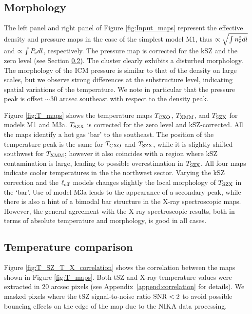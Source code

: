 \documentclass[twocolumn,traditabstract]{aa}
\newcommand{\ccor}[1]{\textcolor{Mypink}{#1}}
\def\xe {n_{\rm e}}
\def\pe {P_{\rm e}}
\def\TSZ {T_{\rm SZX}}
\def \TXC {T_{\rm CXO}}
\def \TXX {T_{\rm XMM}}
\begin{document}
\subsection{Morphology}
\ccor{The left panel and right panel of Figure \ref{fig:Input_maps} represent the effective density and pressure maps in the case of the simplest model M1, thus $\propto \sqrt{\int\xe^2 dl}$ and $\propto \int \pe dl$, respectively. The pressure map is corrected for the kSZ and the zero level (see Section \ref{sec:compT}). The cluster clearly exhibits a disturbed morphology. The morphology of the ICM pressure is similar to that of the density on large scales, but we observe strong differences at the substructure level, indicating spatial variations of the temperature. We note in particular that the pressure peak is offset $\sim 30$ arcsec southeast with respect to the density peak.}

Figure \ref{fig:T_maps} shows the temperature maps ${T}_{\rm CXO}$, ${T}_{\rm XMM}$, and $\TSZ$ for models M1 and M3a. $\TSZ$ is corrected for the zero level and kSZ-corrected. All the maps identify a hot gas `bar' to the southeast. The position of the temperature peak is the same for $\TXC$ and $\TSZ$, while it is slightly shifted southwest for $\TXX$; however it also coincides with a region where kSZ contamination is large, leading to possible overestimation in $\TSZ$. All four maps indicate cooler temperatures in the the northwest sector. Varying the kSZ correction and the $\ell_{\rm eff}$ models changes slightly the local morphology of $\TSZ$ \ccor{in the `bar'. Use of model M3a leads to the appearance of a secondary peak, while there is also a hint of a bimodal bar structure in the X-ray spectroscopic maps.} However, the \ccor{general} agreement with the X-ray spectroscopic results, \ccor{both in terms of absolute temperature and morphology}, is good in all cases. 

\subsection{Temperature comparison}\label{sec:compT}
Figure \ref{fig:T_SZ_T_X_correlation} shows the correlation between the maps shown in Figure \ref{fig:T_maps}. Both tSZ and X-ray temperature values were \ccor{extracted in 20 arcsec pixels (see Appendix~\ref{append:correlation} for details)}. We masked pixels where the tSZ signal-to-noise ratio ${\rm SNR < 2}$ to avoid possible bouncing effects on the edge of the map due to the NIKA data processing.
\end{document}
